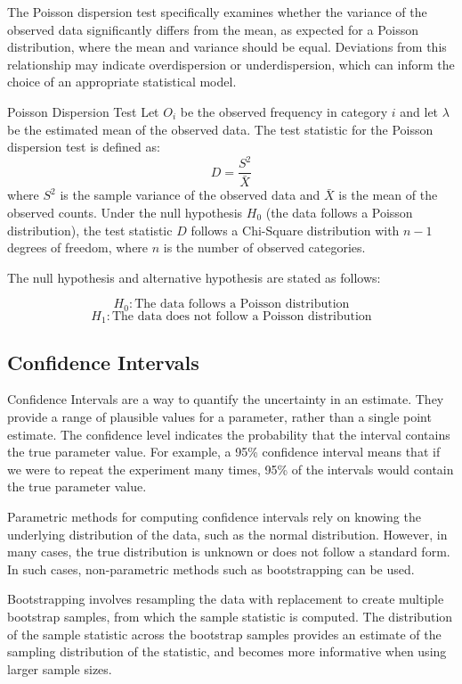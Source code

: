 The Poisson dispersion test specifically examines whether the variance of the observed data significantly differs from the mean, as expected for a Poisson distribution, where the mean and variance should be equal. Deviations from this relationship may indicate overdispersion or underdispersion, which can inform the choice of an appropriate statistical model.
\begin{note}
    {Poisson Dispersion Test}
    Let $O_i$ be the observed frequency in category $i$ and let $\lambda$ be the estimated mean of the observed data. The test statistic for the Poisson dispersion test is defined as:
    \begin{equation}
    D = \frac{S^2}{\bar{X}}
    \end{equation}
    where $S^2$ is the sample variance of the observed data and $\bar{X}$ is the mean of the observed counts.
    Under the null hypothesis $H_0$ (the data follows a Poisson distribution), the test statistic $D$ follows a Chi-Square distribution with $n - 1$ degrees of freedom, where $n$ is the number of observed categories. 

The null hypothesis and alternative hypothesis are stated as follows:

\begin{equation*}
    H_0: \text{The data follows a Poisson distribution}
\end{equation*}
\begin{equation*}
    H_1: \text{The data does not follow a Poisson distribution}
\end{equation*}
\end{note}


\subsection*{Confidence Intervals}
Confidence Intervals are a way to quantify the uncertainty in an estimate. They provide a range of plausible values for a parameter, rather than a single point estimate. The confidence level indicates the probability that the interval contains the true parameter value. For example, a 95\% confidence interval means that if we were to repeat the experiment many times, 95\% of the intervals would contain the true parameter value.

Parametric methods for computing confidence intervals rely on knowing the underlying distribution of the data, such as the normal distribution. However, in many cases, the true distribution is unknown or does not follow a standard form. In such cases, non-parametric methods such as bootstrapping can be used.

Bootstrapping involves resampling the data with replacement to create multiple bootstrap samples, from which the sample statistic is computed. The distribution of the sample statistic across the bootstrap samples provides an estimate of the sampling distribution of the statistic, and becomes more informative when using larger sample sizes.

